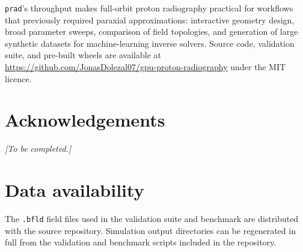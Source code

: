 \documentclass[review,12pt]{elsarticle}
\begin{document}
\texttt{prad}'s throughput makes full-orbit proton radiography practical for
workflows that previously required paraxial approximations: interactive geometry
design, broad parameter sweeps, comparison of field topologies, and generation of
large synthetic datasets for machine-learning inverse solvers. Source code, validation
suite, and pre-built wheels are available at
\url{https://github.com/JonasDolezal07/gpu-proton-radiography} under the MIT licence.

\section*{Acknowledgements}

\emph{[To be completed.]}

\section*{Data availability}

The \texttt{.bfld} field files used in the validation suite and benchmark are
distributed with the source repository. Simulation output directories can be regenerated
in full from the validation and benchmark scripts included in the repository.



\end{document}
